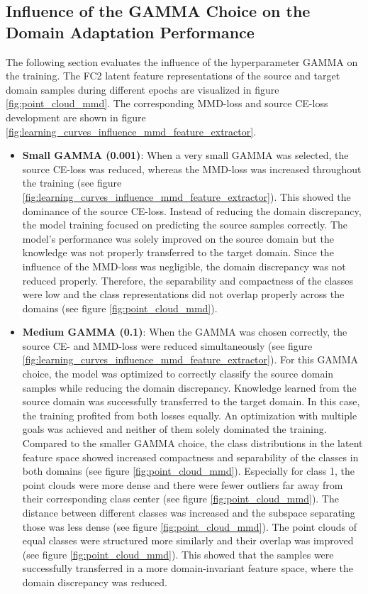 \subsection{Influence of the GAMMA Choice on the Domain Adaptation Performance} \label{sec:Balancing Cross-Entropy and MMD loss}

The following section evaluates the influence of the hyperparameter GAMMA on the training. The FC2 latent feature representations of the source and target domain samples during different epochs are visualized in figure \ref{fig:point_cloud_mmd}. The corresponding MMD-loss and source CE-loss development are shown in figure \ref{fig:learning_curves_influence_mmd_feature_extractor}.
\begin{itemize}
    \item \textbf{Small GAMMA (0.001)}:
    When a very small GAMMA was selected, the source CE-loss was reduced, whereas the MMD-loss was increased throughout the training (see figure \ref{fig:learning_curves_influence_mmd_feature_extractor}). This showed the dominance of the source CE-loss. Instead of reducing the domain discrepancy, the model training focused on predicting the source samples correctly. The model's performance was solely improved on the source domain but the knowledge was not properly transferred to the target domain. Since the influence of the MMD-loss was negligible, the domain discrepancy was not reduced properly. Therefore, the separability and compactness of the classes were low and the class representations did not overlap properly across the domains (see figure \ref{fig:point_cloud_mmd}).
    \item \textbf{Medium GAMMA (0.1)}:
    When the GAMMA was chosen correctly, the source CE- and MMD-loss were reduced simultaneously (see figure \ref{fig:learning_curves_influence_mmd_feature_extractor}). For this GAMMA choice, the model was optimized to correctly classify the source domain samples while reducing the domain discrepancy. Knowledge learned from the source domain was successfully transferred to the target domain. In this case, the training profited from both losses equally. An optimization with multiple goals was achieved and neither of them solely dominated the training. Compared to the smaller GAMMA choice, the class distributions in the latent feature space showed increased compactness and separability of the classes in both domains (see figure \ref{fig:point_cloud_mmd}). Especially for class 1, the point clouds were more dense and there were fewer outliers far away from their corresponding class center (see figure \ref{fig:point_cloud_mmd}). The distance between different classes was increased and the subspace separating those was less dense (see figure \ref{fig:point_cloud_mmd}). The point clouds of equal classes were structured more similarly and their overlap was improved (see figure \ref{fig:point_cloud_mmd}). This showed that the samples were successfully transferred in a more domain-invariant feature space, where the domain discrepancy was reduced.

\end{itemize}

